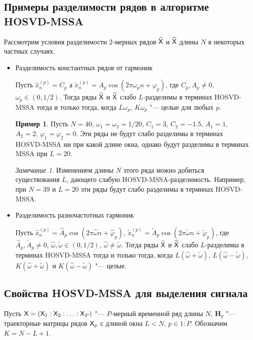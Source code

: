 \documentclass[specialist,
  substylefile=spbu.rtx,
subf,href,colorlinks=true, 12pt]{disser}
\theoremstyle{plain}
\theoremstyle{definition}
\newtheorem{example}{Пример}[section]
\theoremstyle{remark}
\newtheorem*{remark}{Замечание}
\begin{document}
\subsection{Примеры разделимости рядов в алгоритме HOSVD-MSSA}\label{subsec:hosvd-mssa-sep-example}
Рассмотрим условия разделимости $2$-мерных рядов $\widehat{\mathsf{X}}$ и $\widetilde{\mathsf{X}}$ длины $N$ в некоторых
частных случаях.
\begin{itemize}
  \item Разделимость константных рядов от гармоник

    Пусть $\hat{x}_n^{(p)} = C_p$ а
    $\tilde{x}_n^{(p)} = A_p \cos(2\pi \omega_p n + \varphi_p)$,
    где $C_p, A_p \ne 0$, $\omega_p \in (0, 1/2)$.
    Тогда ряды $\widehat{\mathsf{X}}$ и $\widetilde{\mathsf{X}}$ слабо $L$-разделимы в терминах HOSVD-MSSA тогда и только тогда,
    когда $L\omega_p$, $K\omega_p$ "--- целые для любых $p$.
    \begin{example}
      \label{ex:no-sep}
      Пусть $N=40$, $\omega_1=\omega_2=1/20$, $C_1 = 3$, $C_2=-1.5$, $A_1 = 1$, $A_2 = 2$,
      $\varphi_1 = \varphi_2 = 0$.
      Эти ряды не будут слабо разделимы в терминах HOSVD-MSSA ни при какой длине окна, однако
      будут разделимы в терминах MSSA при $L=20$.
    \end{example}
    \begin{remark}
      Изменением длины $N$ этого ряда можно добиться существования $L$, дающего слабую HOSVD-MSSA-разделимость.
      Например, при $N=39$ и $L=20$ эти ряды будут слабо разделимы в терминах HOSVD-MSSA.
    \end{remark}

  \item Разделимость разночастотных гармоник

    Пусть $\hat{x}_n^{(p)} = \widehat{A}_p \cos(2 \pi \hat{\omega} n + \hat{\varphi}_p)$,
    $\tilde{x}_n^{(p)} = \widetilde{A}_p \cos(2\pi \tilde{\omega} n + \tilde{\varphi}_p)$,
    где $\widehat{A}_p, \widetilde{A}_p \ne 0$, \linebreak $\hat{\omega}, \tilde{\omega} \in (0, 1/2)$,
    $\hat{\omega} \ne \tilde{\omega}$.
    Тогда ряды $\widehat{\mathsf{X}}$ и $\widetilde{\mathsf{X}}$ слабо $L$-разделимы в терминах HOSVD-MSSA тогда и только тогда,
    когда $L(\hat{\omega} + \tilde{\omega})$, $L(\hat{\omega} - \tilde{\omega})$,
    $K(\hat{\omega} + \tilde{\omega})$ и $K(\hat{\omega} - \tilde{\omega})$ "--- целые.
\end{itemize}


\subsection{Свойства HOSVD-MSSA для выделения сигнала}\label{subsec:hosvd-mssa-signal-properties}
Пусть $\mathsf{X} = \left(\mathsf{X}_1: \mathsf{X}_2:\ldots: \mathsf{X}_P\right)$ "--- $P$-мерный временной ряд длины $N$,
$\mathbf{H}_p$ "--- траекторные матрицы рядов $\mathsf{X}_p$ с длиной окна $L < N$, $p\in \overline{1:P}$.
Обозначим $K = N - L + 1$.
\end{document}
